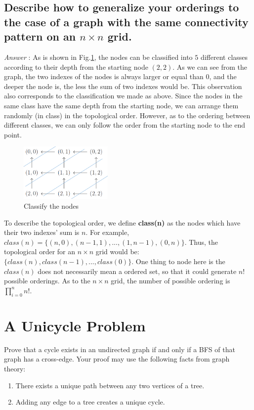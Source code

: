\documentclass[11pt]{article}
\begin{document}
\subsection{Describe how to generalize your orderings to the case of a graph with the same connectivity pattern on an $n\times n$ grid.}
\noindent\emph{Answer} : As is shown in Fig.\ref{fig:fig5}, the nodes can be classified into $5$ different classes according to their depth from the starting node ${(2,2)}$. As we can see from the graph, the two indexes of the nodes is always larger or equal than $0$, and the deeper the node is, the less the sum of two indexes would be. This observation also corresponds to the classification we made as above. Since the nodes in the same class have the same depth from the starting node, we can arrange them randomly (in class) in the topological order. However, as to the ordering between different classes, we can only follow the order from the starting node to the end point. 
\begin{figure}[h]
	\centering
	\includegraphics[width=0.4\textwidth]{Figure/2_1.png}
	\caption{Classify the nodes}
	\label{fig:fig5}
\end{figure}

To describe the topological order, we define \textbf{class(n)} as the nodes which have their two indexes' sum is $n$. For example, $class(n) = \{(n,0),(n-1,1),...,(1,n-1),(0,n)\}$. Thus, the topological order for an $n\times n$ grid would be: $\{class(n),class(n-1),...,class(0)\}$. One thing to node here is the $class(n)$ does not necessarily mean a ordered set, so that it could generate $n!$ possible orderings. As to the $n\times n$ grid, the number of possible ordering is $\prod_{i=0}^{n}n!$.

\section{A Unicycle Problem}

Prove that a cycle exists in an undirected graph if and only if a BFS of that graph has a cross-edge. Your proof may use the following facts from graph theory:
\begin{enumerate}
	\item There exists a unique path between any two vertices of a tree.
	\item Adding any edge to a tree creates a unique cycle.
\end{enumerate}
\end{document}
